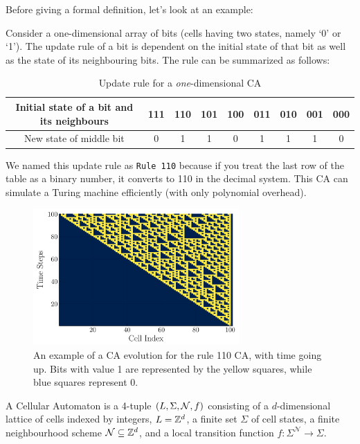 \documentclass[11pt, oneside]{scrbook}
\begin{document}
Before giving a formal definition, let's look at an example:
\begin{example}
    \label{eg:rule110}
    Consider a one-dimensional array of bits (\ie cells having two states, namely `0' or `1'). The update rule of a bit is dependent on the initial state of that bit as well as the state of its neighbouring bits. The rule can be summarized as follows:
    \begin{table}[H]
        \centering
        \begin{tabular}{ | c | c | c | c | c | c | c | c | c | }
            \hline
            Initial state of a bit and its neighbours & 111 & 110 & 101 & 100 & 011 & 010 & 001 & 000 \\
            \hline
            New state of middle bit                   & 0   & 1   & 1   & 0   & 1   & 1   & 1   & 0   \\
            \hline
        \end{tabular}
        \caption{Update rule for a \textit{one}-dimensional CA}
        \label{tab:rule110}
    \end{table}
    We named this update rule as \verb|Rule 110| because if you treat the last row of the table as a binary number, it converts to 110 in the decimal system. This CA can simulate a Turing machine efficiently (with only polynomial overhead).
    \begin{figure}[H]
        \centering
        \includegraphics[width = 0.7\textwidth]{rule110_cellular_automaton.png}
        \caption{An example of a CA evolution for the rule 110 CA, with time going up. Bits with value 1 are
            represented by the yellow squares, while blue squares represent 0.}
        \label{fig:rule110}
    \end{figure} \noindent

\end{example}

\begin{definition}
    A Cellular Automaton is a 4-tuple \(\qty(L, \Sigma, \mathcal{N}, f)\) consisting of a $d$-dimensional lattice of cells indexed by integers, $L = \mathbb Z^d$, a finite set $\Sigma$ of cell states, a finite neighbourhood scheme $\mathcal{N} \subseteq \mathbb Z^d$, and a local transition function $f: \Sigma^{\mathcal{N}} \to \Sigma$.
\end{definition}
\end{document}
